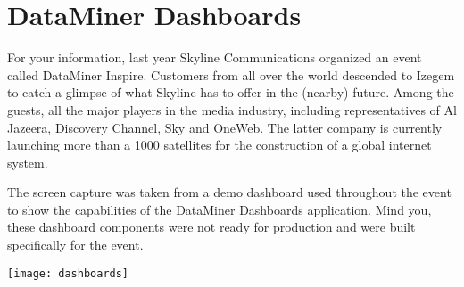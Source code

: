 \chapter{DataMiner Dashboards}
\label{dataminer_dashboards}

For your information, last year Skyline Communications organized an event called DataMiner Inspire. Customers from all over the world descended to Izegem to catch a glimpse of what Skyline has to offer in the (nearby) future. Among the guests, all the major players in the media industry, including representatives of Al Jazeera, Discovery Channel, Sky and OneWeb. The latter company is currently launching more than a 1000 satellites for the construction of a global internet system.

The screen capture was taken from a demo dashboard used throughout the event to show the capabilities of the DataMiner Dashboards application. Mind you, these dashboard components were not ready for production and were built specifically for the event. 
\begin{center}
\texttt{[image: dashboards]}
\end{center}